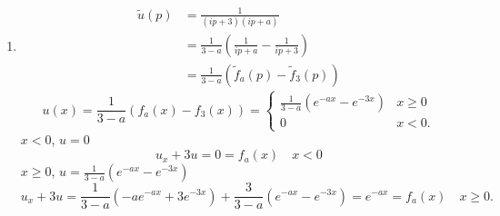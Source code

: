 \documentclass[10pt, a4paper]{article}
\begin{document}
\begin{problem}[Resit $2024$]
\begin{solution}
\begin{enumerate}[label = (\alph*)]
            \item
            \begin{align*}
                \tilde{u}(p) &= \frac{1}{(ip + 3)(ip + a)} \\
                &= \frac{1}{3 - a}\left(\frac{1}{ip + a} - \frac{1}{ip + 3}\right) \\
                &= \frac{1}{3 - a}\left(\tilde{f}_a(p) - \tilde{f}_3(p)\right)
            \end{align*}
            \[
            u(x) = \frac{1}{3 - a}(f_a(x) - f_3(x)) = \begin{cases}
                \frac{1}{3 - a}\left(e ^ {-ax} - e ^ {-3x}\right) & x \geq 0 \\
                0 & x < 0.
            \end{cases}
            \]
            $x < 0$,
            $u = 0$
            \[
            u_x + 3u = 0 = f_a(x) \quad x < 0
            \]
            $x \geq 0$,
            $u = \frac{1}{3 - a}(e ^ {-ax} - e ^ {-3x})$
            \[
            u_x + 3u = \frac{1}{3 - a}\left(-ae ^ {-ax} + 3e ^ {-3x}\right) + \frac{3}{3 - a}(e ^ {-ax} - e ^ {-3x}) = e ^ {-ax} = f_a(x)\quad x \geq 0.
            \]
        \end{enumerate}
    \end{solution}
\end{problem}
\end{document}
